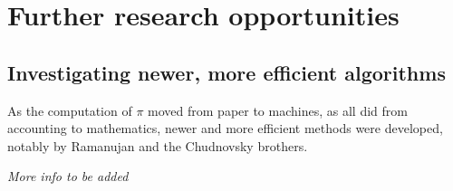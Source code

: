 \section{Further research opportunities}

\subsection{Investigating newer, more efficient algorithms}

As the computation of $\pi$ moved from paper to machines, as all did from accounting to
mathematics, newer and more efficient methods were developed, notably by Ramanujan and
the Chudnovsky brothers.

\textit{More info to be added}